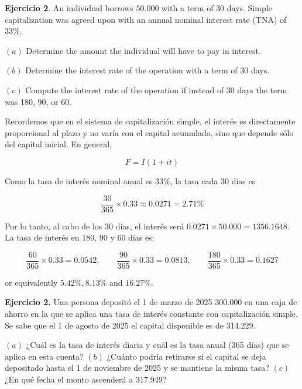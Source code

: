 \documentclass[a4paper, 12pt]{article}
\theoremstyle{definition}
\begin{document}
\begin{shaded}
    \textbf{Ejercicio 2}. An individual borrows $50.000$ with a term of 30 days. 
    Simple capitalization was agreed upon with an annual nominal interest rate
    (TNA) of
    $33\%$.

    $(a)$ Determine the amount the individual will have to pay in interest.

    $(b)$ Determine the interest rate of the operation with a term of 30 days. 

    $(c)$ Compute the interest rate of the operation if instead of 30 days 
    the term was 180, 90, or 60.
\end{shaded}

Recordemos que en el sistema de capitalización simple, el interés es
directamente proporcional al plazo y no varía con el capital acumulado, sino que
depende sólo del capital inicial. En general, 

\begin{equation}
    F = I \left( 1 + it \right) 
\end{equation}

Como la tasa de interés nominal anual es $33\%$, la tasa cada 30 días es 

\begin{equation*}
    \frac{30}{365} \times 0.33 \approx 0.0271 = 2.71\%
\end{equation*}

Por lo tanto, al cabo de los 30 días, el interés será $0.0271 \times 50.000 =
1356.1648$. La tasa de interés en 180, 90 y 60 días es:


\begin{equation*}
    \frac{60}{365} \times 0.33 = 0.0542, \qquad \frac{90}{365} \times 0.33 =
    0.0813, \qquad \frac{180}{365} \times 0.33 = 0.1627
\end{equation*}

or equivalently $5.42\%, 8.13\%$ and $16.27\%$.

\pagebreak 

\begin{shaded}
    \textbf{Ejercicio 2.} Una persona depositó el 1 de marzo de 2025 300.000 en una caja de ahorro en
    la que se aplica una tasa de interés constante con capitalización simple. Se
    sabe que el 1 de agosto de 2025 el capital disponible es de 314.229.

    $(a)$ ¿Cuál es la tasa de interés diaria y cuál es la tasa anual (365 días)
    que se aplica en esta cuenta?
    $(b)$ ¿Cuánto podría retirarse si el capital se deja depositado hasta el 1 de noviembre de 2025 y se mantiene
la misma tasa?
    $(c)$ ¿En qué fecha el monto ascenderá a 317.949?
\end{shaded}
\end{document}
